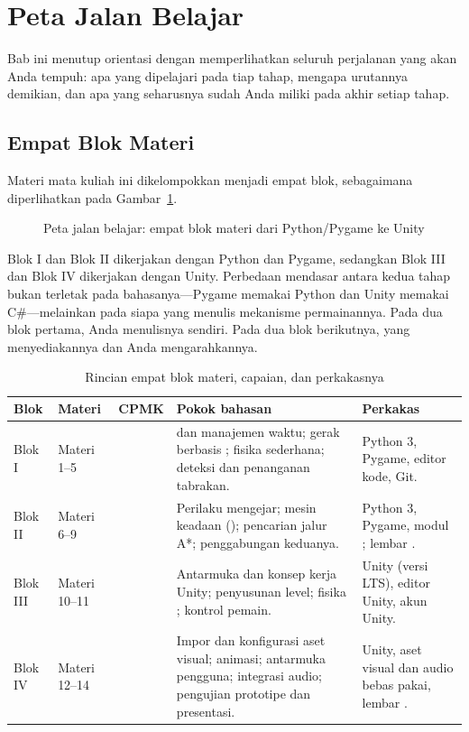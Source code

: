 \section{Peta Jalan Belajar}
\label{sec:peta-jalan}

Bab ini menutup orientasi dengan memperlihatkan seluruh perjalanan yang akan
Anda tempuh: apa yang dipelajari pada tiap tahap, mengapa urutannya demikian,
dan apa yang seharusnya sudah Anda miliki pada akhir setiap tahap.

\subsection{Empat Blok Materi}

Materi mata kuliah ini dikelompokkan menjadi empat blok, sebagaimana
diperlihatkan pada Gambar~\ref{fig:peta-jalan}.

\begin{figure}[htbp]
\centering

\caption{Peta jalan belajar: empat blok materi dari Python/Pygame ke Unity}
\label{fig:peta-jalan}
\end{figure}

Blok I dan Blok II dikerjakan dengan Python dan Pygame, sedangkan Blok III dan
Blok IV dikerjakan dengan Unity. Perbedaan mendasar antara kedua tahap bukan
terletak pada bahasanya---Pygame memakai Python dan Unity memakai C\#---melainkan
pada siapa yang menulis mekanisme permainannya. Pada dua blok pertama, Anda
menulisnya sendiri. Pada dua blok berikutnya,  yang
menyediakannya dan Anda mengarahkannya.

\begin{table}[htbp]
\centering
\caption{Rincian empat blok materi, capaian, dan perkakasnya}
\label{tab:blok-materi-buku}
{\setlength{\tabcolsep}{4pt}\footnotesize%
\begin{tabularx}{\textwidth}{@{}C{1.6cm} C{2.3cm} C{1.6cm} L{4.3cm} Y@{}}
\toprule
\headrow \textbf{Blok} & \textbf{Materi} & \textbf{CPMK} & \textbf{Pokok bahasan} & \textbf{Perkakas} \\
\midrule
Blok I & Materi 1--5 &  &
 dan manajemen waktu; gerak berbasis ;
fisika sederhana; deteksi dan penanganan tabrakan. &
Python 3, Pygame, editor kode, Git. \\
\addlinespace
Blok II & Materi 6--9 &  &
Perilaku mengejar; mesin keadaan (); pencarian jalur A*;
penggabungan keduanya. &
Python 3, Pygame, modul ; lembar . \\
\addlinespace
Blok III & Materi 10--11 &  &
Antarmuka dan konsep kerja Unity; penyusunan level; fisika ;
kontrol pemain. &
Unity (versi LTS), editor Unity, akun Unity. \\
\addlinespace
Blok IV & Materi 12--14 &  &
Impor dan konfigurasi aset visual; animasi; antarmuka pengguna; integrasi
audio; pengujian prototipe dan presentasi. &
Unity, aset visual dan audio bebas pakai, lembar . \\
\bottomrule
\end{tabularx}}
\end{table}

